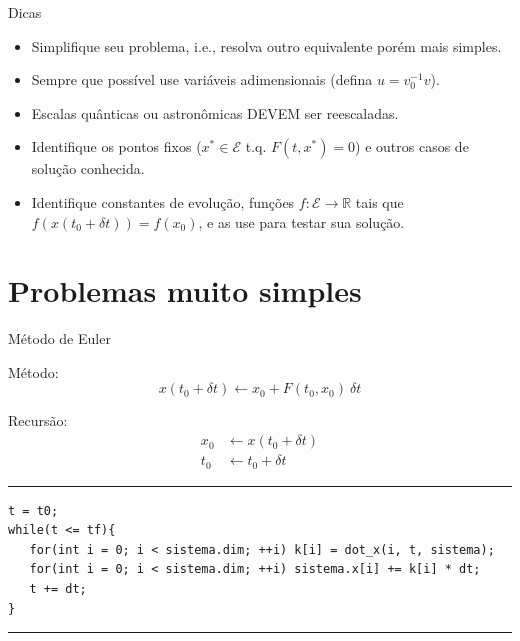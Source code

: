 \documentclass{beamer}
\begin{document}
\begin{frame}{Dicas}
   \begin{itemize}
      \item Simplifique seu problema, i.e.,
      resolva outro equivalente porém mais simples.
      \item Sempre que possível use variáveis adimensionais
      (defina $u = v_0^{-1} v$).
      \item Escalas quânticas ou astronômicas DEVEM ser reescaladas.
      \item Identifique os pontos fixos
      ($x^*\in\mathcal E$ t.q. $F(t, x^*) = 0$)
      e outros casos de solução conhecida.
      \item Identifique constantes de evolução,
      funções $f:\mathcal E\rightarrow\mathbb R$ tais que
      $f(x(t_0 + \delta t)) = f(x_0)$,
      e as use para testar sua solução.
   \end{itemize}
\end{frame}

\section{Problemas muito simples}

\begin{frame}[fragile]{Método de Euler}

   Método:
   \begin{equation}
      x(t_0 + \delta t) \leftarrow x_0 + F(t_0, x_0) ~ \delta t
   \end{equation}

   Recursão:
   \begin{align}
      x_0 &\leftarrow x(t_0 + \delta t) \\
      t_0 &\leftarrow t_0 + \delta t
   \end{align}

   \rule{\textwidth}{1pt}
   \scriptsize
\begin{lstlisting}[style = c]
t = t0;
while(t <= tf){
   for(int i = 0; i < sistema.dim; ++i) k[i] = dot_x(i, t, sistema);
   for(int i = 0; i < sistema.dim; ++i) sistema.x[i] += k[i] * dt;
   t += dt;
}
\end{lstlisting}
   \rule{\textwidth}{1pt}
\end{frame}

\subsection*{}
\end{document}
